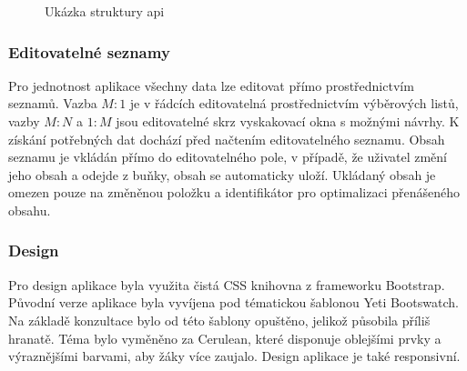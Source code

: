 \documentclass[a4paper,11pt,titlepage,fleqn]{article}
\begin{document}
            \begin{figure}[ht!]
                \caption{Ukázka struktury \gls{api}}
                \label{url-model}
            \end{figure}

        \subsubsection{Editovatelné seznamy}
            Pro jednotnost aplikace všechny data lze editovat přímo prostřednictvím seznamů. Vazba $M:1$ je v řádcích editovatelná prostřednictvím výběrových listů, vazby $M:N$ a $1:M$ jsou editovatelné skrz vyskakovací okna s možnými návrhy. K získání potřebných dat dochází před načtením editovatelného seznamu. Obsah seznamu je vkládán přímo do editovatelného pole, v případě, že uživatel změní jeho obsah a odejde z buňky, obsah se automaticky uloží. Ukládaný obsah je omezen pouze na změněnou položku a identifikátor pro optimalizaci přenášeného obsahu. 

        \subsubsection{Design}
            Pro design aplikace byla využita čistá CSS knihovna z frameworku Bootstrap. Původní verze aplikace byla vyvíjena pod tématickou šablonou Yeti Bootswatch. Na základě konzultace bylo od této šablony opuštěno, jelikož působila příliš hranatě. Téma bylo vyměněno za Cerulean, které disponuje oblejšími prvky a výraznějšími barvami, aby žáky více zaujalo. Design aplikace je také responsivní.
\end{document}
